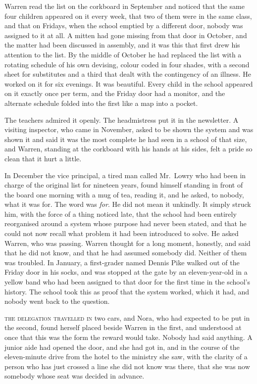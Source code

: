 Warren read the list on the corkboard in September and noticed that the same four children appeared on it every week, that two of them were in the same class, and that on Fridays, when the school emptied by a different door, nobody was assigned to it at all. A mitten had gone missing from that door in October, and the matter had been discussed in assembly, and it was this that first drew his attention to the list. By the middle of October he had replaced the list with a rotating schedule of his own devising, colour coded in four shades, with a second sheet for substitutes and a third that dealt with the contingency of an illness. He worked on it for six evenings. It was beautiful. Every child in the school appeared on it exactly once per term, and the Friday door had a monitor, and the alternate schedule folded into the first like a map into a pocket.

The teachers admired it openly. The headmistress put it in the newsletter. A visiting inspector, who came in November, asked to be shown the system and was shown it and said it was the most complete he had seen in a school of that size, and Warren, standing at the corkboard with his hands at his sides, felt a pride so clean that it hurt a little.

In December the vice principal, a tired man called Mr.~Lowry who had been in charge of the original list for nineteen years, found himself standing in front of the board one morning with a mug of tea, reading it, and he asked, to nobody, what it was for. The word was \emph{for}. He did not mean it unkindly. It simply struck him, with the force of a thing noticed late, that the school had been entirely reorganised around a system whose purpose had never been stated, and that he could not now recall what problem it had been introduced to solve. He asked Warren, who was passing. Warren thought for a long moment, honestly, and said that he did not know, and that he had assumed somebody did. Neither of them was troubled. In January, a first-grader named Dennis Pike walked out of the Friday door in his socks, and was stopped at the gate by an eleven-year-old in a yellow band who had been assigned to that door for the first time in the school's history. The school took this as proof that the system worked, which it had, and nobody went back to the question.


\textsc{the delegation travelled in} two cars, and Nora, who had expected to be put in the second, found herself placed beside Warren in the first, and understood at once that this was the form the reward would take. Nobody had said anything. A junior aide had opened the door, and she had got in, and in the course of the eleven-minute drive from the hotel to the ministry she saw, with the clarity of a person who has just crossed a line she did not know was there, that she was now somebody whose seat was decided in advance.

